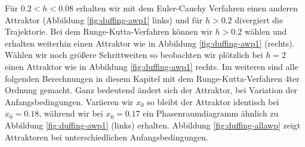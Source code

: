 \documentclass{scrartcl}
\begin{document}
Für $0.2<h<0.08$ erhalten wir mit dem Euler-Cauchy Verfahren einen anderen Attraktor (Abbildung \ref{fig:duffing-awp1} links) und für $h>0.2$ divergiert die Trajektorie. Bei dem Runge-Kutta-Verfahren können wir $h>0.2$ wählen und erhalten weiterhin einen Attraktor wie in Abbildung \ref{fig:duffing-awp1} (rechts). Wählen wir noch größere Schrittweiten so beobachten wir plötzlich bei $h=2$ einen Attraktor wie in Abbildung \ref{fig:duffing-awp1} rechts.
\newline
Im weiteren sind alle folgenden Berechnungen in diesem Kapitel mit dem Runge-Kutta-Verfahren 4ter Ordnung gemacht.
\newline
Ganz bedeutend ändert sich der Attraktor, bei Variation der Anfangsbedingungen. Variieren wir $x_0$ so bleibt der Attraktor identisch bei $x_0=0.18$, während wir bei $x_0=0.17$ ein Phasenraumdiagramm ähnlich zu Abbildung \ref{fig:duffing-awp1} (links) erhalten.
\newline
Abbildung \ref{fig:duffing-allawp} zeigt Attraktoren bei unterschiedlichen Anfangsbedingungen.
\end{document}

